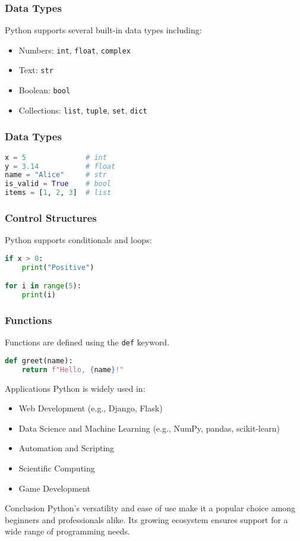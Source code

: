 \begin{frame}[fragile]
\frametitle{Data Types}
Python supports several built-in data types including:
\begin{itemize}
    \item Numbers: \texttt{int}, \texttt{float}, \texttt{complex}
    \item Text: \texttt{str}
    \item Boolean: \texttt{bool}
    \item Collections: \texttt{list}, \texttt{tuple}, \texttt{set}, \texttt{dict}
\end{itemize}
\end{frame}

\begin{frame}[fragile]
\frametitle{Data Types}
\begin{lstlisting}[language=Python]
x = 5              # int
y = 3.14           # float
name = "Alice"     # str
is_valid = True    # bool
items = [1, 2, 3]  # list
\end{lstlisting}
\end{frame}


\begin{frame}[fragile]
\frametitle{Control Structures}
Python supports conditionals and loops:

\begin{lstlisting}[language=python]
if x > 0:
    print("Positive")

for i in range(5):
    print(i)
\end{lstlisting}
\end{frame}



\begin{frame}[fragile]
\frametitle{Functions}
Functions are defined using the \texttt{def} keyword.
\begin{lstlisting}[language=Python]
def greet(name):
    return f"Hello, {name}!"
\end{lstlisting}
\end{frame}


\begin{frame}{Applications}
Python is widely used in:
\begin{itemize}
\item Web Development (e.g., Django, Flask)
\item Data Science and Machine Learning (e.g., NumPy, pandas, scikit-learn)
\item Automation and Scripting
\item Scientific Computing
\item Game Development
\end{itemize}
\end{frame}


\begin{frame}{Conclusion}
Python's versatility and ease of use make it a popular choice among beginners and professionals alike. Its growing ecosystem ensures support for a wide range of programming needs.
\end{frame}
